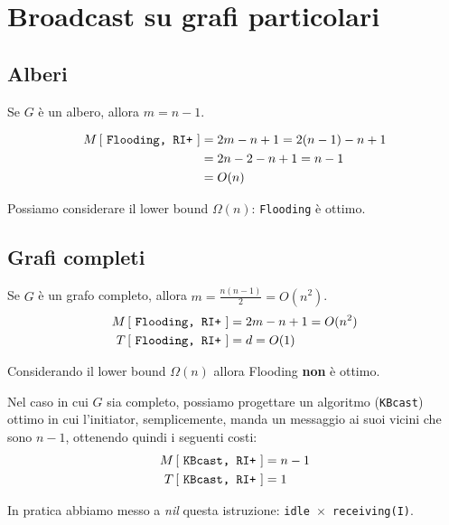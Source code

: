 \section{Broadcast su grafi particolari}

\subsection{Alberi}
Se $G$ è un albero, allora $m=n-1$.

\begin{equation*}
    \begin{split}
        M \left[ \text{ \texttt{Flooding, RI+} } \right]  & = 2m -n+1 = 2(n-1) -n+1\\
        &=  2n-2-n+1 = n-1\\
        &= O(n)
    \end{split}
\end{equation*}

Possiamo considerare il lower bound $\Omega(n)$: \texttt{Flooding} è ottimo.

\subsection{Grafi completi}
Se $G$ è un grafo completo, allora $m = \frac{n(n-1)}{2} = O(n^2)$.
\begin{equation*}
    \begin{split}
        M \left[ \text{ \texttt{Flooding, RI+} } \right] & = 2m-n+1 = O(n^2)\\
        T \left[ \text{ \texttt{Flooding, RI+} } \right] & = d = O(1)
    \end{split}
\end{equation*}

Considerando il lower bound $\Omega(n)$ allora Flooding \textbf{non} è ottimo.

Nel caso in cui $G$ sia completo, possiamo progettare un algoritmo
(\texttt{KBcast}) ottimo in cui l'initiator, semplicemente, manda un messaggio
ai suoi vicini che sono $n-1$, ottenendo quindi i seguenti costi:
\begin{equation*}
    \begin{split}
        M \left[ \text{ \texttt{KBcast, RI+} } \right] & = n-1\\
        T \left[ \text{ \texttt{KBcast, RI+} } \right] & = 1
    \end{split}
\end{equation*}

In pratica abbiamo messo a \textit{nil} questa istruzione: \texttt{idle $\times$
    receiving(I)}.

